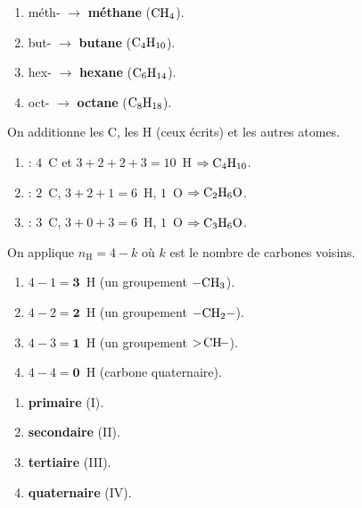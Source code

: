 \documentclass[11pt,a4paper]{article}
\begin{document}
\begin{corrige}
\begin{enumerate}[label=\alph*)]
  \item méth- $\rightarrow$ \textbf{méthane} ($\ce{CH4}$).
  \item but- $\rightarrow$ \textbf{butane} ($\ce{C4H10}$).
  \item hex- $\rightarrow$ \textbf{hexane} ($\ce{C6H14}$).
  \item oct- $\rightarrow$ \textbf{octane} ($\ce{C8H18}$).
\end{enumerate}
\end{corrige}

\begin{corrige}
On additionne les C, les H (ceux écrits) et les autres atomes.
\begin{enumerate}[label=\alph*)]
  \item {} : $4$~C et $3+2+2+3=10$~H $\Rightarrow \ce{C4H10}$.
  \item {} : $2$~C, $3+2+1=6$~H, $1$~O $\Rightarrow \ce{C2H6O}$.
  \item {} : $3$~C, $3+0+3=6$~H, $1$~O $\Rightarrow \ce{C3H6O}$.
\end{enumerate}
\end{corrige}

\begin{corrige}
On applique $n_{\text{H}}=4-k$ où $k$ est le nombre de carbones voisins.
\begin{enumerate}[label=\alph*)]
  \item $4-1=\textbf{3}$~H (un groupement $\ce{-CH3}$).
  \item $4-2=\textbf{2}$~H (un groupement $\ce{-CH2-}$).
  \item $4-3=\textbf{1}$~H (un groupement $>\!\ce{CH}\!-$).
  \item $4-4=\textbf{0}$~H (carbone quaternaire).
\end{enumerate}
\end{corrige}

\begin{corrige}
\begin{enumerate}[label=\alph*)]
  \item \textbf{primaire} (I).
  \item \textbf{secondaire} (II).
  \item \textbf{tertiaire} (III).
  \item \textbf{quaternaire} (IV).
\end{enumerate}
\end{corrige}
\end{document}
